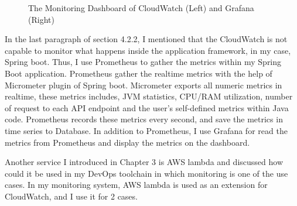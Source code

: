 \begin{figure}[!tbp]
\begin{minipage}[b]{0.50\textwidth}
     \end{minipage}
     \label{fig:monitoring}
     \caption{The Monitoring Dashboard of CloudWatch (Left) and Grafana (Right)}
   \end{figure}
\par
In the last paragraph of section 4.2.2, I mentioned that the CloudWatch is not capable to monitor what happens inside the application framework, in my case, Spring boot. Thus, I use Prometheus to gather the metrics within my Spring Boot application. Prometheus gather the realtime metrics with the help of Micrometer plugin of Spring boot. Micrometer exports all numeric metrics in realtime, these metrics includes, JVM statistics, CPU/RAM utilization, number of request to each API endpoint and the user's self-defined metrics within Java code. Prometheus records these metrics every second, and save the metrics in time series to Database. In addition to Prometheus, I use Grafana for read the metrics from Prometheus and display the metrics on the dashboard.
\par
Another service I introduced in Chapter 3 is AWS lambda and discussed how could it be used in my DevOps toolchain in which monitoring is one of the use cases. In my monitoring system, AWS lambda is used as an extension for CloudWatch, and I use it for 2 cases.
